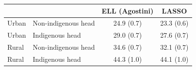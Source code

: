 \begin{tabular}{llcc}
\toprule
 & & ELL (Agostini) & LASSO \\
\midrule
Urban & Non-indigenous head & 24.9 (0.7) & 23.3 (0.6) \\
Urban & Indigenous head & 29.0 (0.7) & 27.6 (0.7) \\
Rural & Non-indigenous head & 34.6 (0.7) & 32.1 (0.7) \\
Rural & Indigenous head & 44.3 (1.0) & 44.1 (1.0) \\
\bottomrule
\end{tabular}

